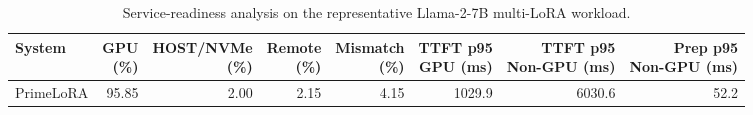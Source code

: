 \begin{table}[t]
\centering
\caption{Service-readiness analysis on the representative Llama-2-7B multi-LoRA workload.}
\label{tab:service_readiness}
\setlength{\tabcolsep}{2.4pt}
\renewcommand{\arraystretch}{1.10}
\begin{tabular}{lrrrrrrr}
\hline
System & \shortstack{GPU\\(\%)} & \shortstack{HOST/NVMe\\(\%)} & \shortstack{Remote\\(\%)} & \shortstack{Mismatch\\(\%)} & \shortstack{TTFT p95\\GPU (ms)} & \shortstack{TTFT p95\\Non-GPU (ms)} & \shortstack{Prep p95\\Non-GPU (ms)} \\
\hline
PrimeLoRA & 95.85 & 2.00 & 2.15 & 4.15 & 1029.9 & 6030.6 & 52.2 \\
\hline
\end{tabular}
\end{table}
